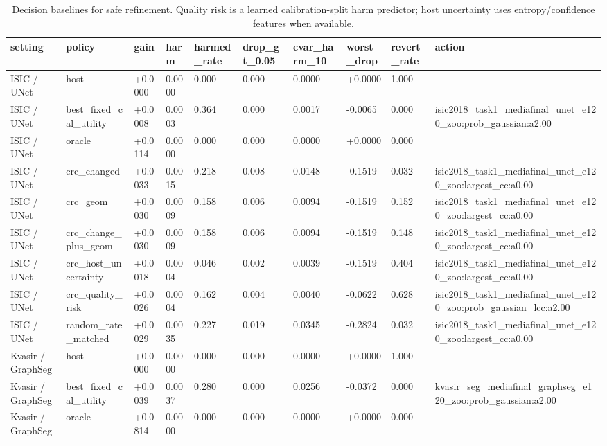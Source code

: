 \begin{table}[t]
\centering
\small
\caption{Decision baselines for safe refinement. Quality risk is a learned calibration-split harm predictor; host uncertainty uses entropy/confidence features when available.}
\label{tab:decision_baselines}
\begin{tabular}{llllllllll}
\toprule
setting & policy & gain & harm & harmed\_rate & drop\_gt\_0.05 & cvar\_harm\_10 & worst\_drop & revert\_rate & action \\
\midrule
ISIC / UNet & host & +0.0000 & 0.0000 & 0.000 & 0.000 & 0.0000 & +0.0000 & 1.000 &  \\
ISIC / UNet & best\_fixed\_cal\_utility & +0.0008 & 0.0003 & 0.364 & 0.000 & 0.0017 & -0.0065 & 0.000 & isic2018\_task1\_mediafinal\_unet\_e120\_zoo:prob\_gaussian:a2.00 \\
ISIC / UNet & oracle & +0.0114 & 0.0000 & 0.000 & 0.000 & 0.0000 & +0.0000 & 0.000 &  \\
ISIC / UNet & crc\_changed & +0.0033 & 0.0015 & 0.218 & 0.008 & 0.0148 & -0.1519 & 0.032 & isic2018\_task1\_mediafinal\_unet\_e120\_zoo:largest\_cc:a0.00 \\
ISIC / UNet & crc\_geom & +0.0030 & 0.0009 & 0.158 & 0.006 & 0.0094 & -0.1519 & 0.152 & isic2018\_task1\_mediafinal\_unet\_e120\_zoo:largest\_cc:a0.00 \\
ISIC / UNet & crc\_change\_plus\_geom & +0.0030 & 0.0009 & 0.158 & 0.006 & 0.0094 & -0.1519 & 0.148 & isic2018\_task1\_mediafinal\_unet\_e120\_zoo:largest\_cc:a0.00 \\
ISIC / UNet & crc\_host\_uncertainty & +0.0018 & 0.0004 & 0.046 & 0.002 & 0.0039 & -0.1519 & 0.404 & isic2018\_task1\_mediafinal\_unet\_e120\_zoo:largest\_cc:a0.00 \\
ISIC / UNet & crc\_quality\_risk & +0.0026 & 0.0004 & 0.162 & 0.004 & 0.0040 & -0.0622 & 0.628 & isic2018\_task1\_mediafinal\_unet\_e120\_zoo:prob\_gaussian\_lcc:a2.00 \\
ISIC / UNet & random\_rate\_matched & +0.0029 & 0.0035 & 0.227 & 0.019 & 0.0345 & -0.2824 & 0.032 & isic2018\_task1\_mediafinal\_unet\_e120\_zoo:largest\_cc:a0.00 \\
Kvasir / GraphSeg & host & +0.0000 & 0.0000 & 0.000 & 0.000 & 0.0000 & +0.0000 & 1.000 &  \\
Kvasir / GraphSeg & best\_fixed\_cal\_utility & +0.0039 & 0.0037 & 0.280 & 0.000 & 0.0256 & -0.0372 & 0.000 & kvasir\_seg\_mediafinal\_graphseg\_e120\_zoo:prob\_gaussian:a2.00 \\
Kvasir / GraphSeg & oracle & +0.0814 & 0.0000 & 0.000 & 0.000 & 0.0000 & +0.0000 & 0.000 &  \\

\end{tabular}
\end{table}
